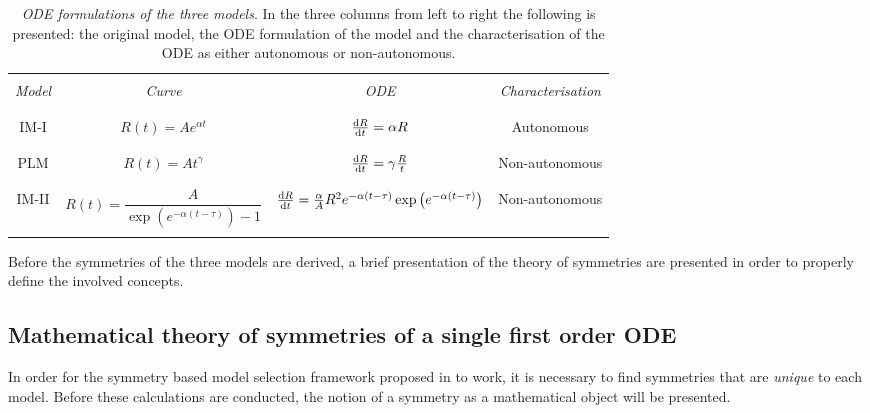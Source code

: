 \begin{table}[htbp!]
\begin{center}
\caption[ODE formulations of the three models.]{\textit{ODE formulations of the three models}. In the three columns from left to right the following is presented: the original model, the ODE formulation of the model and the characterisation of the ODE as either autonomous or non-autonomous. }
\begin{tabular}{||c|c|c|c||}
  \hline\hline
 & & & \\
\textit{Model}  & \textit{Curve} & \textit{ODE} & \textit{Characterisation}\\
 & & & \\  
  \hline\hline
 & & & \\
IM-I & $R(t)=Ae^{\alpha t}$  & $\dv{R}{t}=\alpha R$ & Autonomous\\
 & & & \\
  \hline
 & & & \\
PLM & $R(t)=At^{\gamma}$  & $\dv{R}{t}=\gamma\frac{R}{t}$ & Non-autonomous\\
 & & & \\
  \hline
 & & & \\
IM-II & $R(t)=\dfrac{A}{\exp\left(e^{-\alpha(t-\tau)}\right)-1}$  & $\dv{R}{t}=\frac{\alpha}{A}R^2e^{-\alpha(t-\tau)}\exp\left(e^{-\alpha(t-\tau)}\right)$ & Non-autonomous\\
 & & & \\
  \hline\hline
  \end{tabular}
 \label{tab:ODEs}
\end{center}
\end{table}


Before the symmetries of the three models are derived, a brief presentation of the theory of symmetries are presented in order to properly define the involved concepts. 

\subsection{Mathematical theory of symmetries of a single first order ODE}
In order for the symmetry based model selection framework proposed in \cite{ohlsson2020symmetry} to work, it is necessary to find symmetries that are \textit{unique} to each model. Before these calculations are conducted, the notion of a symmetry as a mathematical object will be presented.  

